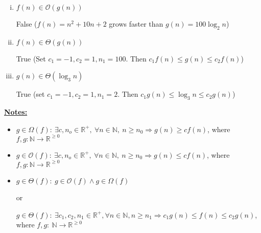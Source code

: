 \documentclass[12pt]{article}
\begin{document}
\begin{enumerate}[1.]
\begin{enumerate}[a)]
\begin{enumerate}[i.]
            \bigskip

            \item \underline{$f(n) \in \mathcal{O}(g(n))$}

            \bigskip

            False ($f(n) = n^2 + 10n + 2$ grows faster than $g(n) = 100 \log_2 n$)

            \bigskip

            \item \underline{$f(n) \in \Theta(g(n))$}

            \bigskip

            True (Set $c_1 = -1 , c_2 = 1, n_1 = 100$. Then $c_1f(n) \leq g(n) \leq c_2f(n)$)

            \bigskip

            \item \underline{$g(n) \in \Theta(\log_3 n)$}

            \bigskip

            True (set $c_1  = -1, c_2 = 1, n_1 = 2$. Then $c_1 g(n) \leq \log_3 n \leq c_2 g(n)$)

        \end{enumerate}

        \bigskip

        \underline{\textbf{Notes:}}

        \bigskip

        \begin{itemize}
            \item
            $g \in \Omega(f):\:\exists c,n_o \in \mathbb{R}^{+},\:\forall n \in
            \mathbb{N},\:n \geq n_0 \Rightarrow g(n) \geq cf(n)$, where $f,g:\mathbb{N} \to \mathbb{R}^{\geq 0}$

            \item

            $g \in \mathcal{O}(f):\:\exists c,n_o \in \mathbb{R}^{+},\:\forall n \in
            \mathbb{N},\:n \geq n_0 \Rightarrow g(n) \leq cf(n)$, where $f,g:\mathbb{N} \to \mathbb{R}^{\geq 0}$

            \item

            $g \in \Theta(f):\: g \in \mathcal{O}(f) \land g \in \Omega(f)$

            or

            $g \in \Theta(f):\:\exists c_1,c_2,n_1 \in \mathbb{R}^{+}, \forall n \in \mathbb{N}, n \geq n_1
            \Rightarrow c_1g(n) \leq f(n) \leq c_2g(n)$, where $f,g:\:\mathbb{N} \to \mathbb{R}^{\geq 0}$
        \end{itemize}
    \end{enumerate}
\end{enumerate}
\end{document}
